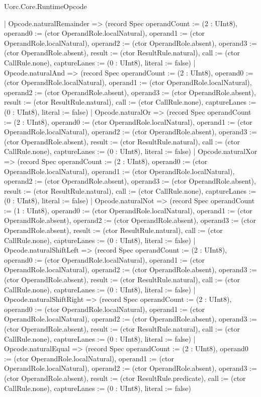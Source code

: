 \begin{lexlean}{Uorc.Core.RuntimeOpcode}
\begin{semanticmodule}
{    | Opcode.naturalRemainder => (record Spec {operandCount := (2 : UInt8), operand0 := (ctor OperandRole.localNatural), operand1 := (ctor OperandRole.localNatural), operand2 := (ctor OperandRole.absent), operand3 := (ctor OperandRole.absent), result := (ctor ResultRule.natural), call := (ctor CallRule.none), captureLanes := (0 : UInt8), literal := false})
    | Opcode.naturalAnd => (record Spec {operandCount := (2 : UInt8), operand0 := (ctor OperandRole.localNatural), operand1 := (ctor OperandRole.localNatural), operand2 := (ctor OperandRole.absent), operand3 := (ctor OperandRole.absent), result := (ctor ResultRule.natural), call := (ctor CallRule.none), captureLanes := (0 : UInt8), literal := false})
    | Opcode.naturalOr => (record Spec {operandCount := (2 : UInt8), operand0 := (ctor OperandRole.localNatural), operand1 := (ctor OperandRole.localNatural), operand2 := (ctor OperandRole.absent), operand3 := (ctor OperandRole.absent), result := (ctor ResultRule.natural), call := (ctor CallRule.none), captureLanes := (0 : UInt8), literal := false})
    | Opcode.naturalXor => (record Spec {operandCount := (2 : UInt8), operand0 := (ctor OperandRole.localNatural), operand1 := (ctor OperandRole.localNatural), operand2 := (ctor OperandRole.absent), operand3 := (ctor OperandRole.absent), result := (ctor ResultRule.natural), call := (ctor CallRule.none), captureLanes := (0 : UInt8), literal := false})
    | Opcode.naturalNot => (record Spec {operandCount := (1 : UInt8), operand0 := (ctor OperandRole.localNatural), operand1 := (ctor OperandRole.absent), operand2 := (ctor OperandRole.absent), operand3 := (ctor OperandRole.absent), result := (ctor ResultRule.natural), call := (ctor CallRule.none), captureLanes := (0 : UInt8), literal := false})
    | Opcode.naturalShiftLeft => (record Spec {operandCount := (2 : UInt8), operand0 := (ctor OperandRole.localNatural), operand1 := (ctor OperandRole.localNatural), operand2 := (ctor OperandRole.absent), operand3 := (ctor OperandRole.absent), result := (ctor ResultRule.natural), call := (ctor CallRule.none), captureLanes := (0 : UInt8), literal := false})
    | Opcode.naturalShiftRight => (record Spec {operandCount := (2 : UInt8), operand0 := (ctor OperandRole.localNatural), operand1 := (ctor OperandRole.localNatural), operand2 := (ctor OperandRole.absent), operand3 := (ctor OperandRole.absent), result := (ctor ResultRule.natural), call := (ctor CallRule.none), captureLanes := (0 : UInt8), literal := false})
    | Opcode.naturalEqual => (record Spec {operandCount := (2 : UInt8), operand0 := (ctor OperandRole.localNatural), operand1 := (ctor OperandRole.localNatural), operand2 := (ctor OperandRole.absent), operand3 := (ctor OperandRole.absent), result := (ctor ResultRule.predicate), call := (ctor CallRule.none), captureLanes := (0 : UInt8), literal := false})
}
\end{semanticmodule}
\end{lexlean}
